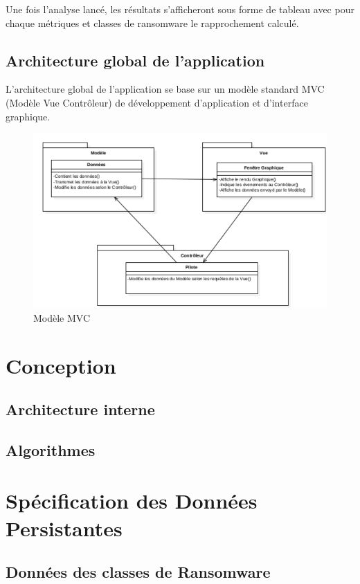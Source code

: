 \documentclass[a4paper, 12pt, twoside]{article}
\begin{document}
Une fois l'analyse lancé, les résultats s'afficheront sous forme de tableau avec pour chaque métriques et classes de ransomware le rapprochement calculé.

\subsection{Architecture global de l'application}
L'architecture global de l'application se base sur un modèle standard MVC (Modèle Vue Contrôleur) de développement d'application et d'interface graphique.
\begin{figure}[!h]
\centering
\includegraphics{MVC.pdf}
\caption{Modèle MVC}
\end{figure}

\section{Conception}
\subsection{Architecture interne}


\subsection{Algorithmes}

\section{Spécification des Données Persistantes}
\subsection{Données des classes de Ransomware}
\end{document}
